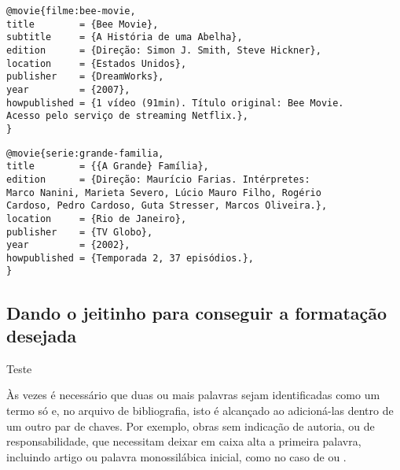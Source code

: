 \begin{verbatim}
@movie{filme:bee-movie,
title        = {Bee Movie},
subtitle     = {A História de uma Abelha},
edition      = {Direção: Simon J. Smith, Steve Hickner},
location     = {Estados Unidos},
publisher    = {DreamWorks},
year         = {2007},
howpublished = {1 vídeo (91min). Título original: Bee Movie. 
Acesso pelo serviço de streaming Netflix.},
}
\end{verbatim}

\begin{verbatim}
@movie{serie:grande-familia,
title        = {{A Grande} Família},
edition      = {Direção: Maurício Farias. Intérpretes: 
Marco Nanini, Marieta Severo, Lúcio Mauro Filho, Rogério 
Cardoso, Pedro Cardoso, Guta Stresser, Marcos Oliveira.},
location     = {Rio de Janeiro},
publisher    = {TV Globo},
year         = {2002},
howpublished = {Temporada 2, 37 episódios.},
}
\end{verbatim}

\subsection{Dando o jeitinho para conseguir a formatação desejada}
Teste

Às vezes é necessário que duas ou mais palavras sejam identificadas como um termo só e, no arquivo de bibliografia, isto é alcançado ao adicioná-las dentro de um outro par de chaves. Por exemplo, obras sem indicação de autoria, ou de responsabilidade, que necessitam deixar em caixa alta a primeira palavra, incluindo artigo ou palavra monossilábica inicial, como no caso de  ou .
